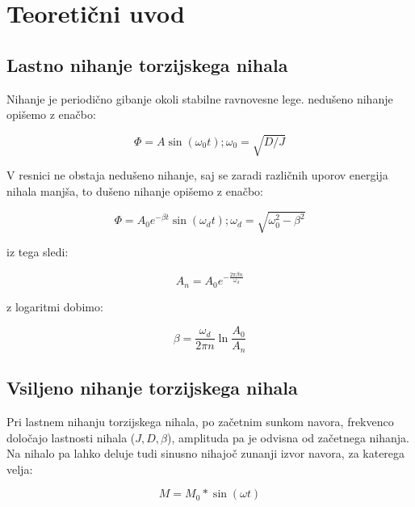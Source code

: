 \section{Teoretični uvod}\label{sec:uvod}
\subsection{Lastno nihanje torzijskega nihala}
Nihanje je periodično gibanje okoli stabilne ravnovesne lege. nedušeno nihanje opišemo z enačbo:

\centering \Large
\begin{equation}
    \Phi = A\sin(\omega_0t); \omega_0 = \sqrt{D/J} 
\end{equation}
\raggedright \normalsize

V resnici ne obstaja nedušeno nihanje, saj se zaradi različnih uporov energija nihala manjša, to dušeno nihanje opišemo z enačbo:


\centering \Large
\begin{equation}
    \Phi = A_0e^{-\beta t}\sin(\omega_d t); \omega_d = \sqrt{\omega_0^2-\beta^2}
\end{equation}
\raggedright \normalsize

 iz tega sledi:
 
\centering \Large
\begin{equation}
    A_n = A_0e^{-\frac{2\pi\beta n}{\omega_d}}
\end{equation}
\raggedright \normalsize

z logaritmi dobimo:

\centering \Large
\begin{equation}
    \beta = \frac{\omega_d}{2\pi n}\ln{\frac{A_0}{A_n}}
\end{equation}
\raggedright \normalsize

\subsection{Vsiljeno nihanje torzijskega nihala}

Pri lastnem nihanju torzijskega nihala, po začetnim sunkom navora, frekvenco določajo lastnosti nihala ($J, D, \beta$), amplituda pa je odvisna od začetnega nihanja.
Na nihalo pa lahko deluje tudi sinusno nihajoč zunanji izvor navora, za katerega velja:

\centering \Large
\begin{equation}
    M = M_0*\sin(\omega t)
\end{equation}
\raggedright \normalsize

